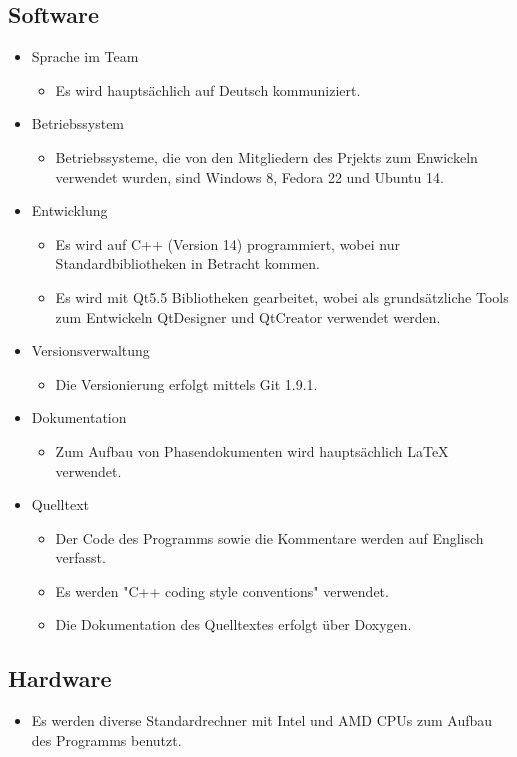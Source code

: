 \subsection{Software}
\begin{itemize}
\item Sprache im Team
	\begin{itemize}[label={--}]
		\item Es wird hauptsächlich auf Deutsch kommuniziert.
	\end{itemize}
\item Betriebssystem
	\begin{itemize}[label={--}]
		\item Betriebssysteme, die von den Mitgliedern des Prjekts zum Enwickeln verwendet wurden, sind Windows 8, Fedora 22 und Ubuntu 14.
	\end{itemize}
\item Entwicklung
	\begin{itemize}[label={--}]
		\item Es wird auf C++ (Version 14) programmiert, wobei nur Standardbibliotheken in Betracht kommen.
		\item Es wird mit Qt5.5 Bibliotheken gearbeitet, wobei als grundsätzliche Tools zum Entwickeln  QtDesigner und QtCreator verwendet werden.
	\end{itemize}
\item Versionsverwaltung
	\begin{itemize}[label={--}]
		\item Die Versionierung erfolgt mittels Git 1.9.1.
	\end{itemize}
\item Dokumentation
	\begin{itemize}[label={--}]
		\item Zum Aufbau von Phasendokumenten wird hauptsächlich LaTeX verwendet.
	\end{itemize}
\item Quelltext
	\begin{itemize}[label={--}]
		\item Der Code des Programms sowie die Kommentare werden auf Englisch verfasst.
		\item Es werden "C++ coding style conventions" verwendet.
		\item Die Dokumentation des Quelltextes erfolgt über Doxygen.
	\end{itemize}
\end{itemize}

\subsection{Hardware}
\begin{itemize}
	\item Es werden diverse Standardrechner mit Intel und AMD CPUs zum Aufbau des Programms benutzt.
\end{itemize}
